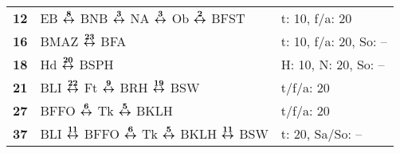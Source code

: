 \begin{minipage}[t]{0.45\textwidth}
\begin{tabular}{>{\bfseries}L{1.2cm}L{9.0cm}L{3.0cm}}
\tram{} 12    & EB $\boldsymbol{\overset{8}{\leftrightarrow}}$ BNB $\boldsymbol{\overset{3}{\leftrightarrow}}$ NA $\boldsymbol{\overset{3}{\leftrightarrow}}$ Ob $\boldsymbol{\overset{2}{\leftrightarrow}}$ BFST                                                                                                   & t: 10, f/a: 20             \\
\tram{} 16    & BMAZ $\boldsymbol{\overset{23}{\leftrightarrow}}$ BFA                                                                                                                                               & t: 10, f/a: 20, So: --     \\
\tram{} 18    & Hd $\boldsymbol{\overset{20}{\leftrightarrow}}$ BSPH                                                                                                                                                & H: 10, N: 20, So: --       \\
\tram{} 21    & BLI $\boldsymbol{\overset{22}{\leftrightarrow}}$ Ft $\boldsymbol{\overset{9}{\leftrightarrow}}$ BRH $\boldsymbol{\overset{19}{\leftrightarrow}}$ BSW                                                                                                                & t/f/a: 20                  \\
\tram{} 27    & BFFO $\boldsymbol{\overset{6}{\leftrightarrow}}$ Tk $\boldsymbol{\overset{5}{\leftrightarrow}}$ BKLH                                                                                                                                & t/f/a: 20                  \\
\tram{} 37    & BLI $\boldsymbol{\overset{11}{\leftrightarrow}}$ BFFO $\boldsymbol{\overset{6}{\leftrightarrow}}$ Tk $\boldsymbol{\overset{5}{\leftrightarrow}}$ BKLH $\boldsymbol{\overset{11}{\leftrightarrow}}$ BSW                                                                                              & t: 20, Sa/So: --           \\
\hline
\end{tabular}
\end{minipage}
